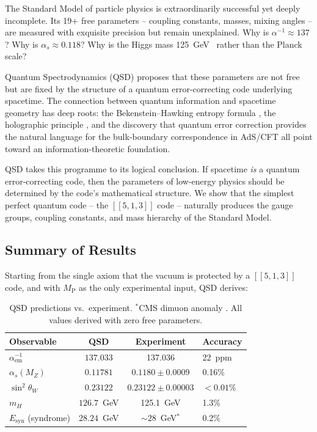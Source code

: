 \documentclass[11pt,a4paper]{article}
\theoremstyle{definition}
\newcommand{\Esyn}{E_{\text{syn}}}
\newcommand{\Mpl}{M_{\mathrm{P}}}
\newcommand{\mH}{m_H}
\begin{document}
The Standard Model of particle physics is extraordinarily successful yet deeply incomplete. Its 19+ free parameters -- coupling constants, masses, mixing angles -- are measured with exquisite precision but remain unexplained. Why is $\alpha^{-1} \approx 137$? Why is $\alpha_s \approx 0.118$? Why is the Higgs mass 125~GeV~\cite{ATLASHiggs2012,CMSHiggs2012} rather than the Planck scale?

Quantum Spectrodynamics (QSD) proposes that these parameters are not free but are fixed by the structure of a quantum error-correcting code underlying spacetime. The connection between quantum information and spacetime geometry has deep roots: the Bekenstein--Hawking entropy formula \cite{Bekenstein1973,Hawking1975}, the holographic principle \cite{tHooft1993,Susskind1995}, and the discovery that quantum error correction provides the natural language for the bulk-boundary correspondence in AdS/CFT \cite{Almheiri2015,Pastawski2015} all point toward an information-theoretic foundation.

QSD takes this programme to its logical conclusion. If spacetime \emph{is} a quantum error-correcting code, then the parameters of low-energy physics should be determined by the code's mathematical structure. We show that the simplest perfect quantum code -- the $[[5,1,3]]$ code -- naturally produces the gauge groups, coupling constants, and mass hierarchy of the Standard Model.

\subsection{Summary of Results}

Starting from the single axiom that the vacuum is protected by a $[[5,1,3]]$ code, and with $\Mpl$ as the only experimental input, QSD derives:

\begin{table}[h]
\centering
\begin{tabular}{lccl}
\toprule
\textbf{Observable} & \textbf{QSD} & \textbf{Experiment} & \textbf{Accuracy} \\
\midrule
$\alpha^{-1}_{\text{em}}$ & $\mathbf{137.033}$ & 137.036 & 22~ppm \\
$\alpha_s(M_Z)$ & $\mathbf{0.11781}$ & $0.1180 \pm 0.0009$ & 0.16\% \\
$\sin^2\theta_W$ & $\mathbf{0.23122}$ & $0.23122 \pm 0.00003$ & $< 0.01\%$ \\
$\mH$ & $\mathbf{126.7}$~GeV & 125.1~GeV & 1.3\% \\
$\Esyn$ (syndrome) & $\mathbf{28.24}$~GeV & $\sim 28$~GeV$^*$ & 0.2\% \\
\bottomrule
\end{tabular}
\caption{QSD predictions vs.\ experiment. $^*$CMS dimuon anomaly \cite{CMS2018dimuon}. All values derived with zero free parameters.}
\label{tab:summary}
\end{table}
\end{document}
